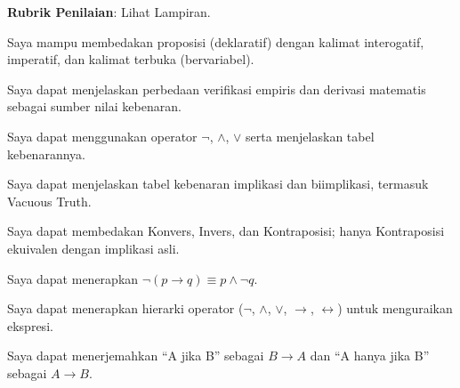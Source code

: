 \documentclass[../main]{subfiles}
\begin{document}
\begin{asesmen}
\textbf{Rubrik Penilaian}: Lihat Lampiran.
\end{asesmen}

\begin{checklist}
  \item Saya mampu membedakan proposisi (deklaratif) dengan kalimat interogatif, imperatif, dan kalimat terbuka (bervariabel).
  \item Saya dapat menjelaskan perbedaan verifikasi empiris dan derivasi matematis sebagai sumber nilai kebenaran.
  \item Saya dapat menggunakan operator $\neg$, $\wedge$, $\vee$ serta menjelaskan tabel kebenarannya.
  \item Saya dapat menjelaskan tabel kebenaran implikasi dan biimplikasi, termasuk Vacuous Truth.
  \item Saya dapat membedakan Konvers, Invers, dan Kontraposisi; hanya Kontraposisi ekuivalen dengan implikasi asli.
  \item Saya dapat menerapkan $\neg(p \rightarrow q) \equiv p \wedge \neg q$.
  \item Saya dapat menerapkan hierarki operator ($\neg$, $\wedge$, $\vee$, $\rightarrow$, $\leftrightarrow$) untuk menguraikan ekspresi.
  \item Saya dapat menerjemahkan ``A jika B'' sebagai $B \rightarrow A$ dan ``A hanya jika B'' sebagai $A \rightarrow B$.
\end{checklist}
\end{document}
